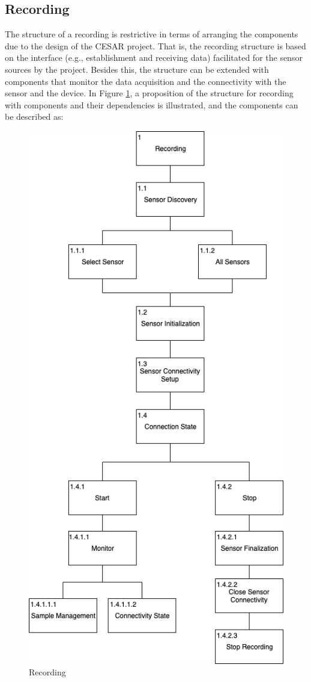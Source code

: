 
\subsection{Recording}\label{soc:recording}
The structure of a recording is restrictive in terms of arranging the components due to the design of the CESAR project. That is, the recording structure is based on the interface (e.g., establishment and receiving data) facilitated for the sensor sources by the project. Besides this, the structure can be extended with components that monitor the data acquisition and the connectivity with the sensor and the device. In Figure \ref{fig:hta_recording}, a proposition of the structure for recording with components and their dependencies is illustrated, and the components can be described as:

\begin{figure}
    \centering
    \includegraphics[scale=0.5]{images/Recording.png}
    \caption{Recording}
    \label{fig:hta_recording}
\end{figure}

